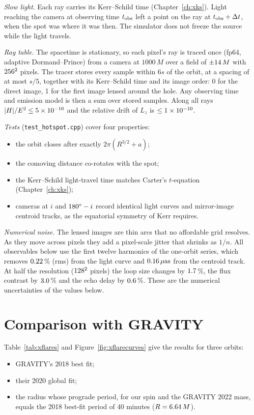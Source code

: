 \emph{Slow light.} Each ray carries its Kerr--Schild time
(Chapter~\ref{ch:xks}). Light reaching the camera at observing time
$t_{\rm obs}$ left a point on the ray at $t_{\rm obs} + \Delta t$, when the spot
was where it was then. The simulator does not freeze the source while the
light travels.

\emph{Ray table.} The spacetime is stationary, so each pixel's ray is traced
once (fp64, adaptive Dormand--Prince) from a camera at $1000\,M$ over a field
of $\pm14\,M$ with $256^2$ pixels. The tracer stores every
sample within $6s$ of the orbit, at a spacing of at most $s/5$, together with
its Kerr--Schild time and its image order: 0 for the direct image, 1 for the
first image lensed around the hole. Any observing time and emission model is
then a sum over stored samples. Along all rays $|H|/E^2 \le 5\times10^{-10}$ and
the relative drift of $L_z$ is $\le 1\times10^{-10}$.

\emph{Tests} (\texttt{test\_hotspot.cpp}) cover four properties:
\begin{itemize}
\item the orbit closes after exactly $2\pi(R^{3/2} + a)$;
\item the comoving distance co-rotates with the spot;
\item the Kerr--Schild light-travel time matches Carter's $t$-equation
(Chapter~\ref{ch:xks});
\item cameras at $i$ and $180^\circ - i$ record identical light curves and
mirror-image centroid tracks, as the equatorial symmetry of Kerr requires.
\end{itemize}

\emph{Numerical noise.} The lensed images are thin arcs that no affordable
grid resolves. As they move across pixels they add a pixel-scale jitter that
shrinks as $1/n$. All observables below use the first twelve harmonics of the
one-orbit series, which removes $0.22$\,\% (rms) from the light
curve and $0.16\,\mu\mathrm{as}$ from the centroid track. At half the
resolution ($128^2$ pixels) the loop size changes by $1.7$\,\%,
the flux contrast by $3.0$\,\% and the echo delay by
$0.6$\,\%. These are the numerical uncertainties of the values below.

\section{Comparison with GRAVITY}

Table~\ref{tab:xflares} and Figure~\ref{fig:xflarecurves} give the results
for three orbits:
\begin{itemize}
\item GRAVITY's 2018 best fit;
\item their 2020 global fit;
\item the radius whose prograde period, for our spin and the GRAVITY 2022
mass, equals the 2018 best-fit period of 40 minutes ($R = 6.64\,M$).
\end{itemize}

